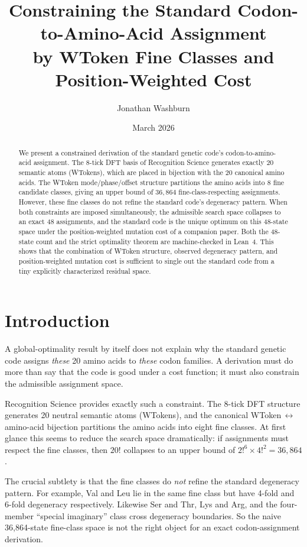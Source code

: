 \documentclass[11pt,twocolumn]{article}
\title{Constraining the Standard Codon-to-Amino-Acid Assignment\\by WToken Fine Classes and Position-Weighted Cost}
\author[1]{Jonathan Washburn}
\affil[1]{Independent Researcher}
\date{March 2026}
\begin{document}
\maketitle

\begin{abstract}
We present a constrained derivation of the standard genetic code's
codon-to-amino-acid assignment. The 8-tick DFT basis of Recognition
Science generates exactly 20 semantic atoms (WTokens), which are placed
in bijection with the 20 canonical amino acids. The WToken
mode/phase/offset structure partitions the amino acids into 8 fine
candidate classes, giving an upper bound of $36{,}864$ fine-class-respecting
assignments. However, these fine classes do not refine the standard code's
degeneracy pattern. When both constraints are imposed simultaneously, the
admissible search space collapses to an exact 48 assignments, and the
standard code is the unique optimum on this 48-state space under the
position-weighted mutation cost of a companion paper. Both the 48-state
count and the strict optimality theorem are machine-checked in Lean~4.
This shows that the combination of WToken structure, observed degeneracy
pattern, and position-weighted mutation cost is sufficient to single out
the standard code from a tiny explicitly characterized residual space.
\end{abstract}

\section{Introduction}

A global-optimality result by itself does not explain why the standard
genetic code assigns \emph{these} 20 amino acids to \emph{these} codon
families. A derivation must do more than say that the code is good under a
cost function; it must also constrain the admissible assignment space.

Recognition Science provides exactly such a constraint. The 8-tick DFT
structure generates 20 neutral semantic atoms (WTokens), and the canonical
WToken$\,\leftrightarrow\,$amino-acid bijection partitions the amino acids
into eight fine classes. At first glance this seems to reduce the search
space dramatically: if assignments must respect the fine classes, then
$20!$ collapses to an upper bound of $2!^6 \times 4!^2 = 36{,}864$.

The crucial subtlety is that the fine classes do \emph{not} refine the
standard degeneracy pattern. For example, Val and Leu lie in the same fine
class but have 4-fold and 6-fold degeneracy respectively. Likewise Ser and
Thr, Lys and Arg, and the four-member ``special imaginary'' class cross
degeneracy boundaries. So the naive 36,864-state fine-class space is not
the right object for an exact codon-assignment derivation.
\end{document}
